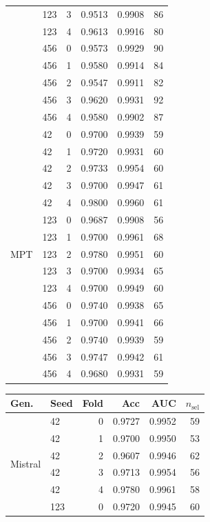 \documentclass[11pt]{article}
\begin{document}
\begin{table}[!htbp]
\begin{minipage}[t]{0.48\textwidth}
\begin{tabular}{llrrrr}
 & 123 & 3 & 0.9513 & 0.9908 & 86 \\
 & 123 & 4 & 0.9613 & 0.9916 & 80 \\
 & 456 & 0 & 0.9573 & 0.9929 & 90 \\
 & 456 & 1 & 0.9580 & 0.9914 & 84 \\
 & 456 & 2 & 0.9547 & 0.9911 & 82 \\
 & 456 & 3 & 0.9620 & 0.9931 & 92 \\
 & 456 & 4 & 0.9580 & 0.9902 & 87 \\
\midrule
\multirow{15}{*}{MPT}
 & 42  & 0 & 0.9700 & 0.9939 & 59 \\
 & 42  & 1 & 0.9720 & 0.9931 & 60 \\
 & 42  & 2 & 0.9733 & 0.9954 & 60 \\
 & 42  & 3 & 0.9700 & 0.9947 & 61 \\
 & 42  & 4 & 0.9800 & 0.9960 & 61 \\
 & 123 & 0 & 0.9687 & 0.9908 & 56 \\
 & 123 & 1 & 0.9700 & 0.9961 & 68 \\
 & 123 & 2 & 0.9780 & 0.9951 & 60 \\
 & 123 & 3 & 0.9700 & 0.9934 & 65 \\
 & 123 & 4 & 0.9700 & 0.9949 & 60 \\
 & 456 & 0 & 0.9740 & 0.9938 & 65 \\
 & 456 & 1 & 0.9700 & 0.9941 & 66 \\
 & 456 & 2 & 0.9740 & 0.9939 & 59 \\
 & 456 & 3 & 0.9747 & 0.9942 & 61 \\
 & 456 & 4 & 0.9680 & 0.9931 & 59 \\
\bottomrule
\end{tabular}
\end{minipage}%
\hfill
\begin{minipage}[t]{0.48\textwidth}
\centering
\begin{tabular}{llrrrr}
\toprule
Gen. & Seed & Fold & Acc & AUC & $n_{\text{sel}}$ \\
\midrule
\multirow{15}{*}{Mistral}
 & 42  & 0 & 0.9727 & 0.9952 & 59 \\
 & 42  & 1 & 0.9700 & 0.9950 & 53 \\
 & 42  & 2 & 0.9607 & 0.9946 & 62 \\
 & 42  & 3 & 0.9713 & 0.9954 & 56 \\
 & 42  & 4 & 0.9780 & 0.9961 & 58 \\
 & 123 & 0 & 0.9720 & 0.9945 & 60 \\

\end{tabular}
\end{minipage}
\end{table}
\end{document}
